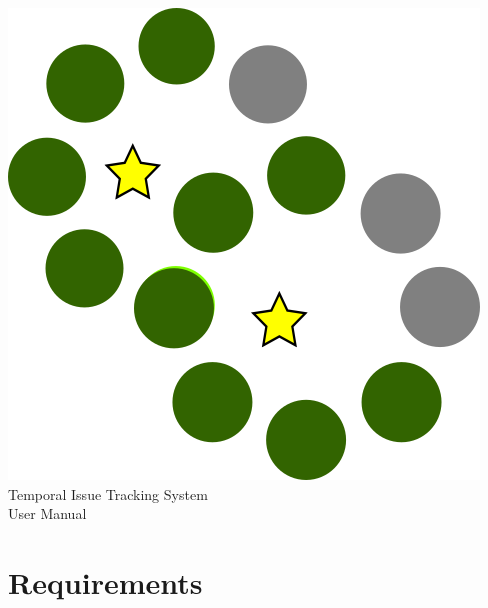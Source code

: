 \documentclass{article}
\begin{document}
\vfill
\begin{center}
    \includegraphics[scale=0.12]{../img/favicon.png}\\
    {\huge Temporal Issue Tracking System\\}
    {\Large User Manual}
\end{center}
\vfill
\newpage
\tableofcontents
\newpage
\setcounter{page}{3}
\section{Requirements}
\end{document}
